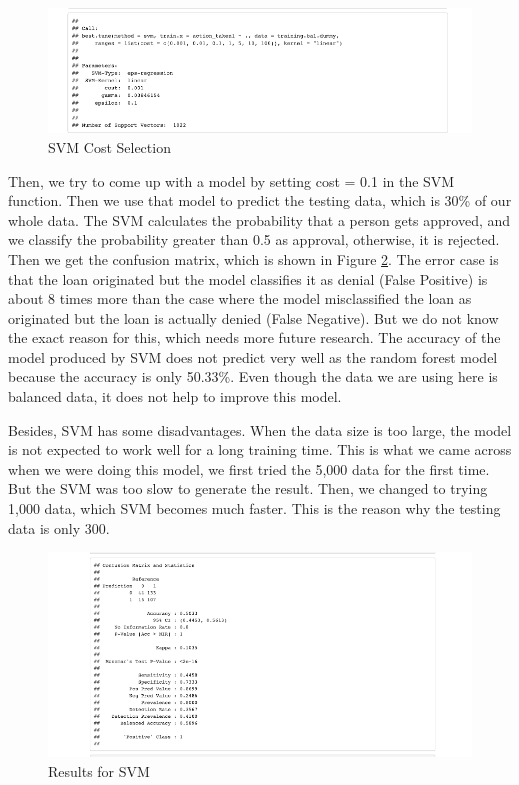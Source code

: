 \documentclass{jpp}
\begin{document}
\begin{figure}
  \centering
  \includegraphics[width=.9\linewidth]{svm_cost.png} 
  \caption{SVM Cost Selection}
\label{svm_costs}
\end{figure}

Then, we try to come up with a model by setting cost = 0.1 in the SVM function. Then we use that model to predict the testing data, which is 30\% of our whole data. The SVM calculates the probability that a person gets approved, and we classify the probability greater than 0.5 as approval, otherwise, it is rejected. Then we get the confusion matrix, which is shown in Figure \ref{svm_results}. The error case is that the loan originated but the model classifies it as denial (False Positive) is about 8 times more than the case where the model misclassified the loan as originated but the loan is actually denied (False Negative). But we do not know the exact reason for this, which needs more future research. The accuracy of the model produced by SVM does not predict very well as the random forest model because the accuracy is only 50.33\%. Even though the data we are using here is balanced data, it does not help to improve this model. 

Besides, SVM has some disadvantages. When the data size is too large, the model is not expected to work well for a long training time. This is what we came across when we were doing this model,  we first tried the 5,000 data for the first time. But the SVM was too slow to generate the result. Then, we changed to trying 1,000 data, which SVM becomes much faster. This is the reason why the testing data is only 300.  

\begin{figure}
  \centering
  \includegraphics[width=.9\linewidth]{svm_results.png}  
  \caption{Results for SVM}
\label{svm_results}
\end{figure}
\end{document}
